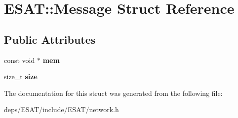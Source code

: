 \hypertarget{struct_e_s_a_t_1_1_message}{}\section{E\+S\+AT\+:\+:Message Struct Reference}
\label{struct_e_s_a_t_1_1_message}
\subsection*{Public Attributes}
\begin{DoxyCompactItemize}
\item 
\mbox{\label{struct_e_s_a_t_1_1_message_a8916a9cbc44e7451b3dd310db2135f8f}} 
const void $\ast$ {\bfseries mem}
\item 
\mbox{\label{struct_e_s_a_t_1_1_message_a68299efa83e982ab5409e78211f6b69d}} 
size\+\_\+t {\bfseries size}
\end{DoxyCompactItemize}


The documentation for this struct was generated from the following file\+:\begin{DoxyCompactItemize}
\item 
deps/\+E\+S\+A\+T/include/\+E\+S\+A\+T/network.\+h\end{DoxyCompactItemize}
